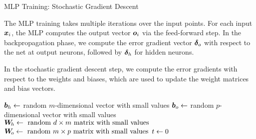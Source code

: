 %
%
%
%

\begin{frame}{MLP Training: Stochastic Gradient Descent}

The MLP training takes multiple iterations over the input points. For
each input ${\boldsymbol x}_i$, the MLP computes the output vector ${\boldsymbol o}_i$ via the
feed-forward step. In the backpropagation phase, we compute the error
gradient vector ${\bm \delta}_o$ with respect to the net at output neurons,
followed by ${\bm \delta}_h$ for hidden neurons. 

\medskip

In the stochastic gradient descent
step, we compute the error gradients with respect to the weights and
biases, which are used to update the weight matrices and bias vectors.

\medskip

\begin{tightalgo}[H]{\textwidth-18pt}
\Algorithm{}
${\boldsymbol b}_{h} \leftarrow$ random $m$-dimensional vector with small
values\; 
${\boldsymbol b}_{o} \leftarrow$ random $p$-dimensional vector with small
values\;
${\boldsymbol W}_{\!h} \leftarrow \text{ random } d \times m \text{ matrix with small
values}$\;
${\boldsymbol W}_{\!o} \leftarrow  \text{ random } m \times p \text{ matrix with small
values}$\;
$t \leftarrow 0$ \;
\end{tightalgo}
\end{frame}

